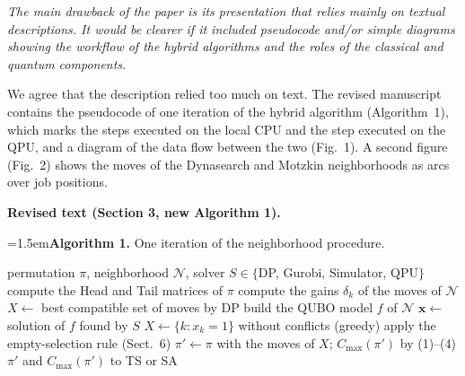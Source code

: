 \documentclass[12pt]{article}
\newenvironment{rc}[1]{\par\medskip\noindent\itshape\renewcommand{\emph}[1]{\textbf{##1}}\ignorespaces}{\par}
\newcommand{\answer}[1]{\par\smallskip\noindent #1\par}
\newcommand{\change}[3]{\par\smallskip\noindent\textbf{Revised text (#1).}\par
  {\leftskip=1.5em\noindent#3\par}}
\begin{document}
\begin{rc}{R1.1 --- Presentation: pseudocode and diagrams}
The main drawback of the paper is its presentation that relies mainly on textual descriptions. It would be clearer if it included pseudocode and/or simple diagrams showing the workflow of the hybrid algorithms and the roles of the classical and quantum components.
\end{rc}
\answer{We agree that the description relied too much on text. The revised manuscript contains the pseudocode of one iteration of the hybrid algorithm (Algorithm~1), which marks the steps executed on the local CPU and the step executed on the QPU, and a diagram of the data flow between the two (Fig.~1). A second figure (Fig.~2) shows the moves of the Dynasearch and Motzkin neighborhoods as arcs over job positions.}
\change{Section 3, new Algorithm 1}{\textit{(no counterpart in the original manuscript)}}{\textbf{Algorithm 1.} One iteration of the neighborhood procedure.\par\begin{algorithmic}[1]
\Require permutation $\pi$, neighborhood $\mathcal{N}$, solver $S\in\{$DP, Gurobi, Simulator, QPU$\}$
\State compute the Head and Tail matrices of $\pi$ \Comment{CPU}
\State compute the gains $\delta_k$ of the moves of $\mathcal{N}$ \Comment{CPU}
\If{$S=$ DP}
  \State $X\gets$ best compatible set of moves by DP \Comment{CPU}
\Else
  \State build the QUBO model $f$ of $\mathcal{N}$ \Comment{CPU}
  \State $\mathbf{x}\gets$ solution of $f$ found by $S$ \Comment{CPU; QPU via Leap}
  \State $X\gets\{k : x_k=1\}$ without conflicts (greedy) \Comment{CPU}
\EndIf
\If{$X=\emptyset$} apply the empty-selection rule (Sect.~6) \EndIf
\State $\pi'\gets\pi$ with the moves of $X$; $C_{\max}(\pi')$ by (1)--(4) \Comment{CPU}
\State \Return $\pi'$ and $C_{\max}(\pi')$ to TS or SA
\end{algorithmic}}
\end{document}
